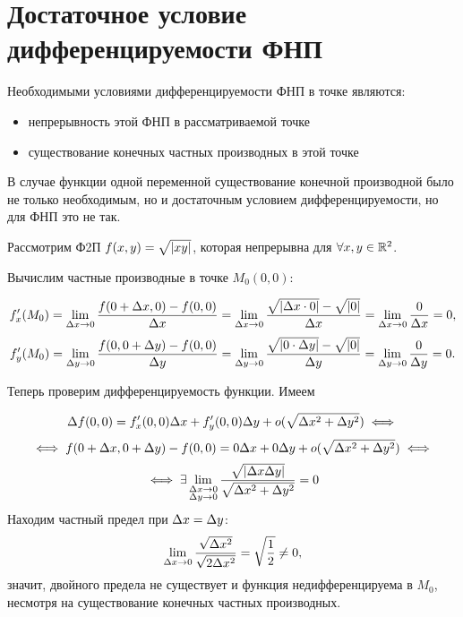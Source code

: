 \documentclass[../../main.tex]{subfiles}
\begin{document}
\section{Достаточное условие дифференцируемости ФНП}

Необходимыми условиями дифференцируемости ФНП в точке являются:
\begin{itemize}
\item непрерывность этой ФНП в рассматриваемой точке
\item существование конечных частных производных в этой точке
\end{itemize}
В случае функции одной переменной существование конечной производной было
не только необходимым, но и достаточным условием дифференцируемости, но
для ФНП это не так.
\begin{exmp}
Рассмотрим Ф2П $f(x,y) = \sqrt{\left|{xy}\right|}$, которая непрерывна для $\forall x,y
\in \mathbb{R}^2$.

Вычислим частные производные в точке $M_0(0,0)$:

\[
f'_x(M_0) = 
\lim_{\Delta x \to 0} \frac{f(0+\Delta x, 0) -f(0,0)}{\Delta x}=
\lim_{\Delta x \to 0} \frac{\sqrt{\left|{\Delta x \cdot 0}\right|}-\sqrt{\left|{0}\right|}}{\Delta x}=
\lim_{\Delta x \to 0} \frac{0}{\Delta x}=
0,
\]
\[
f'_y(M_0) = 
\lim_{\Delta y \to 0} \frac{f(0,0+\Delta y) -f(0,0)}{\Delta y}=
\lim_{\Delta y \to 0} \frac{\sqrt{\left|{0 \cdot \Delta y}\right|}-\sqrt{\left|{0}\right|}}{\Delta y}=
\lim_{\Delta y \to 0} \frac{0}{\Delta y}=
0.
\]

Теперь проверим дифференцируемость функции. Имеем

\[\Delta f(0,0) = f'_x(0,0)\Delta x+f'_y(0,0)\Delta y + o(\sqrt{\Delta x^2+\Delta y^2})
\iff\]
\[\iff f(0+\Delta x,0+\Delta y)-f(0,0)=0\Delta x+0\Delta y+o(\sqrt{\Delta x^2+\Delta y^2})\iff\]
\[\iff \exists\lim_{\substack{\Delta x \to 0\\ \Delta y \to 0}}
\frac{\sqrt{\left|{\Delta x\Delta y}\right|}}{\sqrt{\Delta x^2+\Delta y^2}}=0\]
Находим частный предел при $\Delta x = \Delta y$:
\[\lim_{\Delta x \to 0}\frac{\sqrt{\Delta x^2}}{\sqrt{2\Delta x^2}} = \sqrt{\frac{1}
{2}} \ne 0,\]
значит, двойного предела не существует и
функция недифференцируема в $M_0$, несмотря на существование конечных
частных производных.
\end{exmp}
\end{document}
